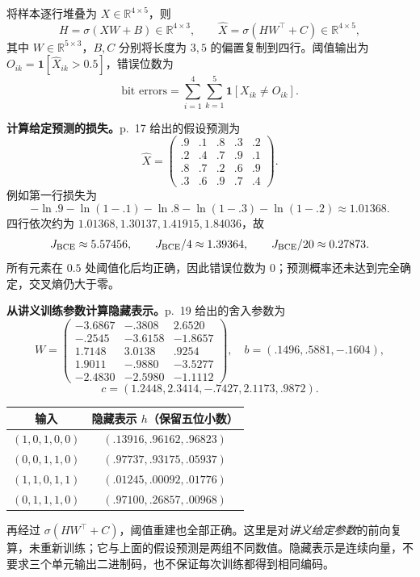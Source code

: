 \begin{workedsolution}
将样本逐行堆叠为 $X\in\mathbb R^{4\times5}$，则
\[
 H=\sigma(XW+B)\in\mathbb R^{4\times3},\qquad
 \hat X=\sigma(HW^\top+C)\in\mathbb R^{4\times5},
\]
其中 $W\in\mathbb R^{5\times3}$，$B,C$ 分别将长度为 $3,5$ 的偏置复制到四行。阈值输出为 $O_{ik}=\mathbf1[\hat X_{ik}>0.5]$，错误位数为
\[
 \text{bit errors}=\sum_{i=1}^4\sum_{k=1}^5\mathbf1[X_{ik}\ne O_{ik}].
\]

\textbf{计算给定预测的损失。}p.~17 给出的假设预测为
\[
 \hat X=\begin{pmatrix}
 .9&.1&.8&.3&.2\\
 .2&.4&.7&.9&.1\\
 .8&.7&.2&.6&.9\\
 .3&.6&.9&.7&.4
 \end{pmatrix}.
\]
例如第一行损失为
\[
 -\ln.9-\ln(1-.1)-\ln.8-\ln(1-.3)-\ln(1-.2)
 \approx1.01368.
\]
四行依次约为 $1.01368,1.30137,1.41915,1.84036$，故
\[
 J_{\rm BCE}\approx5.57456,\qquad
 J_{\rm BCE}/4\approx1.39364,\qquad J_{\rm BCE}/20\approx0.27873.
\]
所有元素在 $0.5$ 处阈值化后均正确，因此错误位数为 $0$；预测概率还未达到完全确定，交叉熵仍大于零。

\textbf{从讲义训练参数计算隐藏表示。}p.~19 给出的舍入参数为
\[
 W=\begin{pmatrix}
 -3.6867&-.3808&2.6520\\
 -.2545&-3.6158&-1.8657\\
 1.7148&3.0138&.9254\\
 1.9011&-.9880&-3.5277\\
 -2.4830&-2.5980&-1.1112
 \end{pmatrix},
 \quad b=(.1496,.5881,-.1604),
\]
\[
 c=(1.2448,2.3414,-.7427,2.1173,.9872).
\]
\begin{center}
\small
\begin{tabular}{@{}cc@{}}
\toprule
输入 & 隐藏表示 $h$（保留五位小数） \\
\midrule
$(1,0,1,0,0)$ & $(.13916,.96162,.96823)$ \\
$(0,0,1,1,0)$ & $(.97737,.93175,.05937)$ \\
$(1,1,0,1,1)$ & $(.01245,.00092,.01776)$ \\
$(0,1,1,1,0)$ & $(.97100,.26857,.00968)$ \\
\bottomrule
\end{tabular}
\end{center}
再经过 $\sigma(HW^\top+C)$，阈值重建也全部正确。这里是对\emph{讲义给定参数}的前向复算，未重新训练；它与上面的假设预测是两组不同数值。隐藏表示是连续向量，不要求三个单元输出二进制码，也不保证每次训练都得到相同编码。
\end{workedsolution}

